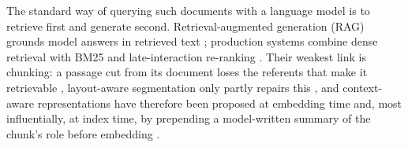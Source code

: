 \documentclass[pdflatex,sn-mathphys-num]{sn-jnl}
\theoremstyle{thmstyleone}%
\theoremstyle{thmstylethree}%
\begin{document}
The standard way of querying such documents with a language model is to retrieve first and generate second. Retrieval-augmented generation (RAG) grounds model answers in retrieved text \cite{lewisetal2021,info16090766,ram2023incontext}; production systems combine dense retrieval \cite{karpukhin2020dpr} with BM25 \cite{robertson1995okapi,robertson2009bm25} and late-interaction re-ranking \cite{khattab2020colbert,santhanam2022colbertv2,kiran2025hybrid,wang2024searching}. Their weakest link is chunking: a passage cut from its document loses the referents that make it retrievable \cite{merola2025reconstructingcontextevaluatingadvanced,smith2024evaluating,qu2024semanticchunkingworthcomputational,chen2023densex}, layout-aware segmentation only partly repairs this \cite{auer2024doclingtechnicalreport,verma2025s2chunkinghybridframework}, and context-aware representations have therefore been proposed at embedding time \cite{gunther2024latechunking} and, most influentially, at index time, by prepending a model-written summary of the chunk's role before embedding \cite{anthropic2024contextual}.
\end{document}
